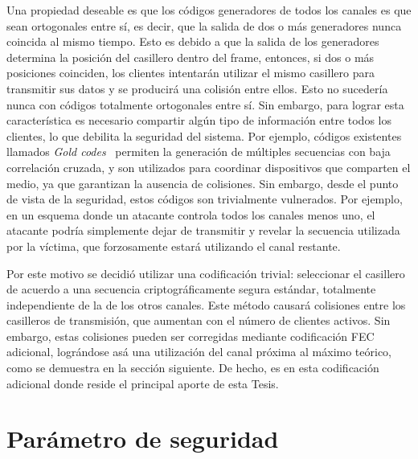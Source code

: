 Una propiedad deseable es que los códigos generadores de todos los canales es que sean ortogonales entre sí, es decir, que la salida de dos o más generadores nunca coincida al mismo tiempo. Esto es debido a que la salida de los generadores determina la posición del casillero dentro del frame, entonces, si dos o más posiciones coinciden, los clientes intentarán utilizar el mismo casillero para transmitir sus datos y se producirá una colisión entre ellos. Esto no sucedería nunca con códigos totalmente ortogonales entre sí. Sin embargo, para lograr esta característica es necesario compartir algún tipo de información entre todos los clientes, lo que debilita la seguridad del sistema. Por ejemplo, códigos existentes llamados \textit{Gold codes}~\cite{gold1967optimal} permiten la generación de múltiples secuencias con baja correlación cruzada, y son utilizados para coordinar dispositivos que comparten el medio, ya que garantizan la ausencia de colisiones. Sin embargo, desde el punto de vista de la seguridad, estos códigos son trivialmente vulnerados. Por ejemplo, en un esquema donde un atacante controla todos los canales menos uno, el atacante podría simplemente dejar de transmitir y revelar la secuencia utilizada por la víctima, que forzosamente estará utilizando el canal restante.

Por este motivo se decidió utilizar una codificación trivial: seleccionar el casillero de acuerdo a una secuencia criptográficamente segura estándar, totalmente independiente de la de los otros canales. Este método causará colisiones entre los casilleros de transmisión, que aumentan con el número de clientes activos. Sin embargo, estas colisiones pueden ser corregidas mediante codificación FEC adicional, lográndose asá una utilización del canal próxima al máximo teórico, como se demuestra en la sección siguiente. De hecho, es en esta codificación adicional donde reside el principal aporte de esta Tesis.

\section{Parámetro de seguridad}

